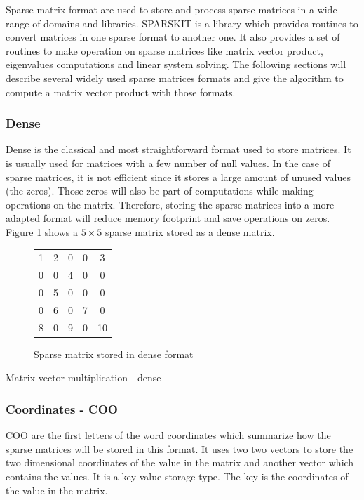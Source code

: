 Sparse matrix format are used to store and process sparse matrices in a wide range of domains and libraries.
SPARSKIT \cite{Saad1990} is a library which provides routines to convert matrices in one sparse format to another one.
It also provides a set of routines to make operation on sparse matrices like matrix vector product, eigenvalues computations and linear system solving.
The following sections will describe several widely used sparse matrices formats and give the algorithm to compute a matrix vector product with those formats.

\subsubsection{Dense}
Dense is the classical and most straightforward format used to store matrices.
It is usually used for matrices with a few number of null values.
In the case of sparse matrices, it is not efficient since it stores a large amount of unused values (the zeros).
Those zeros will also be part of computations while making operations on the matrix.
Therefore, storing the sparse matrices into a more adapted format will reduce memory footprint and save operations on zeros.
Figure \ref{fig:methods:dense_ex} shows a $5 \times 5$ sparse matrix stored as a dense matrix.

\begin{figure}
\centering
\begin{tabular}{|ccccc|}
\hline
1 & 2 & 0 & 0 & 3 \\
0 & 0 & 4 & 0 & 0 \\
0 & 5 & 0 & 0 & 0 \\
0 & 6 & 0 & 7 & 0 \\
8 & 0 & 9 & 0 & 10 \\
\hline
\end{tabular}
\caption{Sparse matrix stored in dense format \label{fig:methods:dense_ex}}
\end{figure}

\begin{algorithm}[h]
	\DontPrintSemicolon
	\caption{Matrix vector multiplication - dense\label{fig:methods:dense_algo}}
\end{algorithm}

\subsubsection{Coordinates - COO}
COO are the first letters of the word coordinates which summarize how the sparse matrices will be stored in this format.
It uses two two vectors to store the two dimensional coordinates of the value in the matrix and another vector which contains the values.
It is a key-value storage type.
The key is the coordinates of the value in the matrix.

